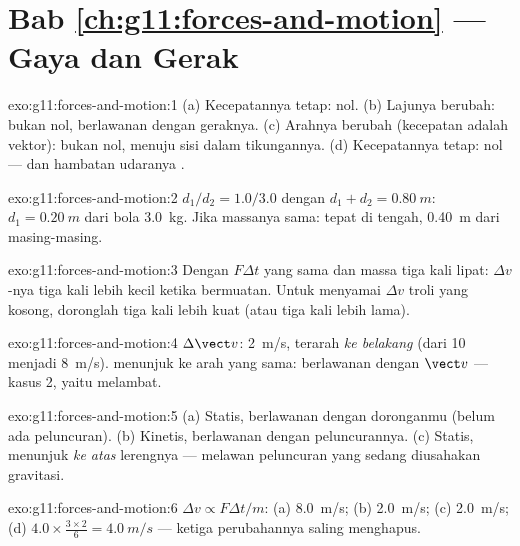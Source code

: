 \section*{Bab \ref{ch:g11:forces-and-motion} --- Gaya dan Gerak}

\begin{solution}{exo:g11:forces-and-motion:1}
(a) Kecepatannya tetap:  nol. (b) Lajunya berubah: bukan
nol, berlawanan dengan geraknya. (c) Arahnya berubah (kecepatan adalah
vektor): bukan nol, menuju sisi dalam tikungannya. (d) Kecepatannya
tetap: nol ---  dan hambatan udaranya .
\end{solution}

\begin{solution}{exo:g11:forces-and-motion:2}
$d_1/d_2 = 1.0/3.0$ dengan $d_1 + d_2 = \qty{0.80}{m}$:
$d_1 = \qty{0.20}{m}$ dari bola \qty{3.0}{kg}. Jika massanya sama:
tepat di tengah, \qty{0.40}{m} dari masing-masing.
\end{solution}

\begin{solution}{exo:g11:forces-and-motion:3}
Dengan $F\Delta t$ yang sama dan massa tiga kali lipat: $\Delta v$-nya
tiga kali lebih kecil ketika bermuatan. Untuk menyamai $\Delta v$ troli
yang kosong, doronglah tiga kali lebih kuat (atau tiga kali lebih lama).
\end{solution}

\begin{solution}{exo:g11:forces-and-motion:4}
$\Delta \vect v$: \qty{2}{m/s}, terarah \emph{ke belakang} (dari
\num{10} menjadi \qty{8}{m/s}).  menunjuk ke arah yang
sama: berlawanan dengan $\vect v$ --- kasus 2, yaitu melambat.
\end{solution}

\begin{solution}{exo:g11:forces-and-motion:5}
(a) Statis, berlawanan dengan doronganmu (belum ada peluncuran).
(b) Kinetis, berlawanan dengan peluncurannya. (c) Statis, menunjuk
\emph{ke atas} lerengnya --- melawan peluncuran yang sedang diusahakan
gravitasi.
\end{solution}

\begin{solution}{exo:g11:forces-and-motion:6}
$\Delta v \propto F\Delta t/m$: (a) \qty{8.0}{m/s}; (b) \qty{2.0}{m/s};
(c) \qty{2.0}{m/s}; (d) $4.0 \times \frac{3 \times 2}{6} =
\qty{4.0}{m/s}$ --- ketiga perubahannya saling menghapus.
\end{solution}

